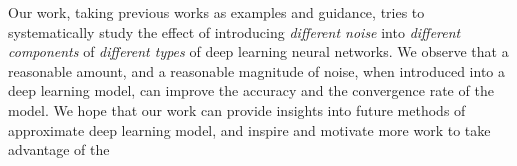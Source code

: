 Our work, taking previous works as examples and guidance, tries to
systematically study the effect of introducing {\em different noise} into {\em
different components} of {\em different types} of deep learning neural networks.
We observe that a reasonable amount, and a reasonable magnitude of noise, when
introduced into a deep learning model, can improve the accuracy and the
convergence rate of the model. We hope that our work can provide insights into
future methods of approximate deep learning model, and inspire and motivate more
work to take advantage of the 

